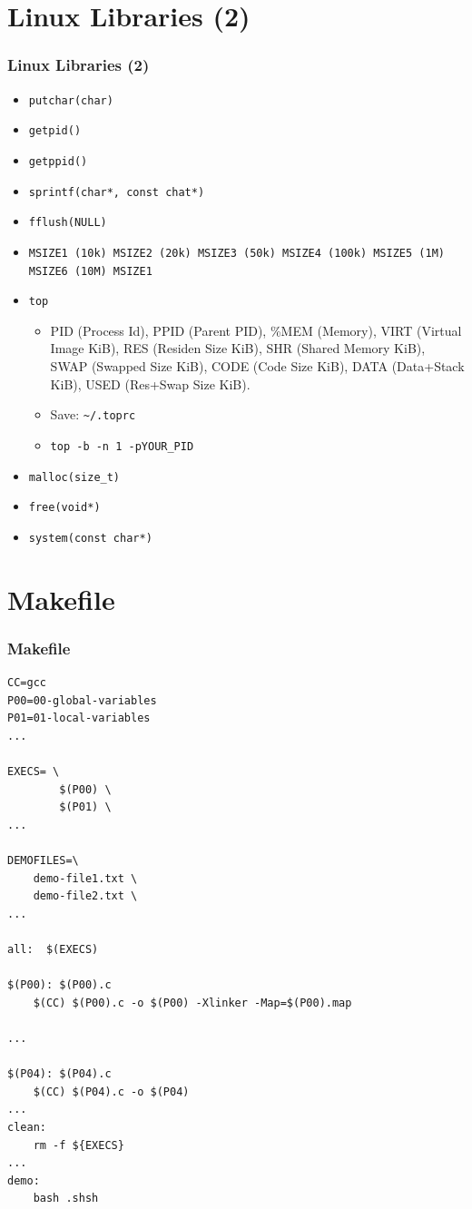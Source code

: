 \documentclass[aspectratio=169, xcolor=table, notheorems, hyperref={pdfpagelabels=false}]{beamer}
\begin{document}
\section{Linux Libraries (2)}
\begin{frame}
\frametitle{Linux Libraries (2)}
\begin{itemize}
\item \texttt{putchar(char)}
\item \texttt{getpid()}
\item \texttt{getppid()}
\item \texttt{sprintf(char*, const chat*)}
\item \texttt{fflush(NULL)}
\item \texttt{MSIZE1 (10k) MSIZE2 (20k) MSIZE3 (50k) MSIZE4 (100k) MSIZE5 (1M) MSIZE6 (10M) MSIZE1}
\item \texttt{top}
\begin{itemize}
\item PID (Process Id), PPID (Parent PID), \%MEM (Memory), VIRT (Virtual Image KiB), 
	RES (Residen Size KiB), SHR (Shared Memory KiB), SWAP (Swapped Size KiB), 
	CODE (Code Size KiB), DATA (Data+Stack KiB), USED (Res+Swap Size KiB).
\item Save: \texttt{\textasciitilde{}/.toprc}
\item \texttt{top -b -n 1 -pYOUR\_PID}
\end{itemize}
\item \texttt{malloc(size\_t)}
\item \texttt{free(void*)}
\item \texttt{system(const char*)}
\end{itemize}
\end{frame}

\section{Makefile}
\begin{frame}[fragile]
\frametitle{Makefile}
\begin{lstlisting}[basicstyle=\ttfamily\tiny]
CC=gcc
P00=00-global-variables
P01=01-local-variables
...
	
EXECS= \
        $(P00) \
        $(P01) \
...

DEMOFILES=\
	demo-file1.txt \
	demo-file2.txt \
...

all:  $(EXECS)

$(P00): $(P00).c
	$(CC) $(P00).c -o $(P00) -Xlinker -Map=$(P00).map

...

$(P04): $(P04).c
	$(CC) $(P04).c -o $(P04)
...
clean:
	rm -f ${EXECS} 
...
demo:
	bash .shsh
\end{lstlisting}
\end{frame}
\end{document}
